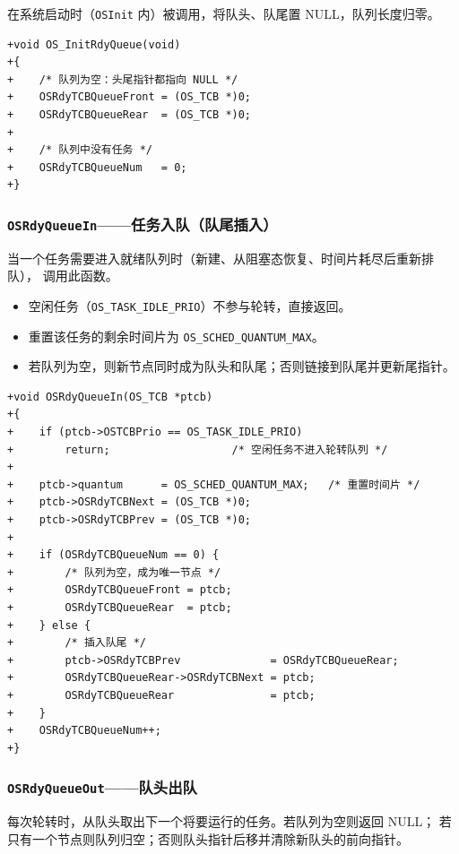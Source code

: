 \documentclass[12pt,a4paper]{article}
\begin{document}
在系统启动时（\texttt{OSInit} 内）被调用，将队头、队尾置 NULL，队列长度归零。

\begin{lstlisting}[style=diffstyle,caption={os\_core.c — 就绪队列初始化}]
+void OS_InitRdyQueue(void)
+{
+    /* 队列为空：头尾指针都指向 NULL */
+    OSRdyTCBQueueFront = (OS_TCB *)0;
+    OSRdyTCBQueueRear  = (OS_TCB *)0;
+
+    /* 队列中没有任务 */
+    OSRdyTCBQueueNum   = 0;
+}
\end{lstlisting}

\subsubsection{\texttt{OSRdyQueueIn}——任务入队（队尾插入）}

当一个任务需要进入就绪队列时（新建、从阻塞态恢复、时间片耗尽后重新排队），
调用此函数。

\begin{itemize}
  \item 空闲任务（\texttt{OS\_TASK\_IDLE\_PRIO}）不参与轮转，直接返回。
  \item 重置该任务的剩余时间片为 \texttt{OS\_SCHED\_QUANTUM\_MAX}。
  \item 若队列为空，则新节点同时成为队头和队尾；否则链接到队尾并更新尾指针。
\end{itemize}

\begin{lstlisting}[style=diffstyle,caption={os\_core.c — 任务入队}]
+void OSRdyQueueIn(OS_TCB *ptcb)
+{
+    if (ptcb->OSTCBPrio == OS_TASK_IDLE_PRIO)
+        return;                   /* 空闲任务不进入轮转队列 */
+
+    ptcb->quantum      = OS_SCHED_QUANTUM_MAX;   /* 重置时间片 */
+    ptcb->OSRdyTCBNext = (OS_TCB *)0;
+    ptcb->OSRdyTCBPrev = (OS_TCB *)0;
+
+    if (OSRdyTCBQueueNum == 0) {
+        /* 队列为空，成为唯一节点 */
+        OSRdyTCBQueueFront = ptcb;
+        OSRdyTCBQueueRear  = ptcb;
+    } else {
+        /* 插入队尾 */
+        ptcb->OSRdyTCBPrev              = OSRdyTCBQueueRear;
+        OSRdyTCBQueueRear->OSRdyTCBNext = ptcb;
+        OSRdyTCBQueueRear               = ptcb;
+    }
+    OSRdyTCBQueueNum++;
+}
\end{lstlisting}

\subsubsection{\texttt{OSRdyQueueOut}——队头出队}

每次轮转时，从队头取出下一个将要运行的任务。若队列为空则返回 NULL；
若只有一个节点则队列归空；否则队头指针后移并清除新队头的前向指针。
\end{document}
